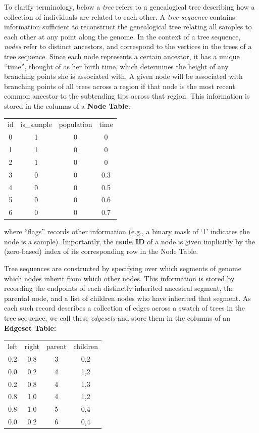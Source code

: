 \documentclass{article}
\begin{document}
To clarify terminology,
below a \emph{tree} refers to
a genealogical tree describing how a collection of individuals are related to each other.
A \emph{tree sequence} contains information sufficient to reconstruct the genealogical
tree relating all samples to each other at any point along the genome.
In the context of a tree sequence, \emph{nodes} refer to distinct ancestors,
and correspond to the vertices in the trees of a tree sequence.
Since each node represents a certain ancestor, it has a unique ``time'', thought of as her birth time,
which determines the height of any branching points she is associated with.  A given node will be
associated with branching points of all trees across a region if that node
is the most recent common ancestor to the subtending tips across that region.
This information is stored in the columns of a \textbf{Node Table}:
\begin{center}
\begin{tabular}{cccc}
    id   &  is\_sample &  population &  time \\
    0    &  1          & 0           & 0 \\
    1    &  1          & 0           & 0 \\
    2    &  1          & 0           & 0 \\
    3    &  0          & 0           & 0.3 \\
    4    &  0          & 0           & 0.5 \\
    5    &  0          & 0           & 0.6 \\
    6    &  0          & 0           & 0.7 \\
\end{tabular}
\end{center}
where ``flags'' records other information
(e.g., a binary mask of `1' indicates the node is a sample).
Importantly, the \textbf{node ID} of a node is given implicitly
by the (zero-based) index of its corresponding row in the Node Table.

Tree sequences are constructed by specifying over which segments of genome
which nodes inherit from which other nodes.  This information is stored by
recording the endpoints of each distinctly inherited ancestral segment,
the parental node, and a list of children nodes who have inherited that segment.
As each such record describes a collection of edges across a swatch of trees in the tree sequence,
we call these \emph{edgesets}
and store them in the columns of an \textbf{Edgeset Table:}
\begin{center}
\begin{tabular}{cccc}
    left & right & parent & children \\
    0.2  &  0.8  &  3     & 0,2 \\
    0.0  &  0.2  &  4     & 1,2 \\
    0.2  &  0.8  &  4     & 1,3 \\
    0.8  &  1.0  &  4     & 1,2 \\
    0.8  &  1.0  &  5     & 0,4 \\
    0.0  &  0.2  &  6     & 0,4  \\
\end{tabular}
\end{center}
\end{document}

